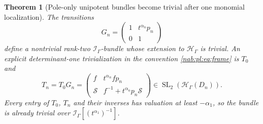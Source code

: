 \documentclass[11pt,letterpaper]{article}
\newtheorem{theorem}{Theorem}[section]
\theoremstyle{definition}
\theoremstyle{remark}
\newcommand{\HH}{\mathscr H_\Gamma}
\newcommand{\II}{\mathscr I_\Gamma}
\newcommand{\SL}{\operatorname{SL}}
\numberwithin{equation}{section}
\begin{document}
\begin{theorem}[Pole-only unipotent bundles become trivial after one monomial
localization]\label{nab:pl:thm:ranktwo}
The transitions
\begin{equation}\label{nab:pl:eq:ranktwoG}
 G_n=\begin{pmatrix}1&t^{\alpha_n}p_n\\0&1\end{pmatrix}
\end{equation}
define a nontrivial rank-two $\II$-bundle whose extension to $\HH$ is trivial.
An explicit determinant-one trivialization in the convention
\eqref{nab:pl:eq:frame} is $T_0$ and
\begin{equation}\label{nab:pl:eq:Tn}
 T_n=T_0G_n=
 \begin{pmatrix}
  f&t^{\alpha_n}fp_n\\
  \mathcal S&f^{-1}+t^{\alpha_n}p_n\mathcal S
 \end{pmatrix}\in\SL_2(\HH(D_n)).
\end{equation}
Every entry of $T_0$, $T_n$ and their inverses has valuation at least
$-\alpha_1$, so the bundle is already trivial over $\II[(t^{\alpha_1})^{-1}]$.
\end{theorem}
\end{document}
